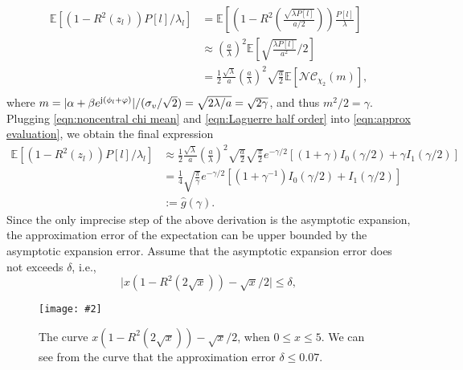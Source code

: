 \documentclass[12pt,draftclsnofoot,journal,onecolumn]{IEEEtran}
\theoremstyle{nonumberplain}
\def \nc {\mathcal{NC}}
\newcommand{\myincludegraphics}[2][width=12cm]{\texttt{[image: \#2]}}
\begin{document}
    \begin{equation}
        \begin{aligned}
        \mathbb{E}[(1-R^2(z_l))P[l]/\lambda_l] & = \mathbb{E}\left[\left(1-R^2\left(\frac{\sqrt{\lambda P[l]}}{a/2}\right)\right)\frac{P[l]}{\lambda}\right] \\
        & \approx \left(\frac{a}{\lambda}\right)^2 \mathbb{E}\left[ \sqrt{\frac{\lambda P[l]}{a^2}}/2 \right]\\
        & = \frac{1}{2}\frac{\sqrt{\lambda}}{a}\left(\frac{a}{\lambda}\right)^2 \sqrt{\frac{a}{2}}\mathbb{E}\left[\nc_{\chi_2}(m)\right],\\
        \end{aligned}
        \label{eqn:approx evaluation}
    \end{equation}
    where $m=\lvert\alpha + \beta e^{{\rm j} (\phi_l + \varphi)}\rvert/(\sigma_v / \sqrt{2}) = \sqrt{2\lambda/a} = \sqrt{2\gamma}$, and thus $m^2/2=\gamma$. Plugging \eqref{eqn:noncentral chi mean} and \eqref{eqn:Laguerre half order} into \eqref{eqn:approx evaluation}, we obtain the final expression 
    \begin{equation}
        \begin{aligned}
        \mathbb{E}[(1-R^2(z_l))P[l]/\lambda_l] & \approx \frac{1}{2}\frac{\sqrt{\lambda}}{a}\left(\frac{a}{\lambda}\right)^2 \sqrt{\frac{a}{2}} \sqrt{\frac{\pi}{2}} e^{-\gamma/2}\left[(1+\gamma)I_0(\gamma/2)+\gamma I_1(\gamma/2)\right] \\
        & = \frac{1}{4}\sqrt{\frac{\pi}{\gamma}}e^{-\gamma/2}\left[(1+\gamma^{-1})I_0(\gamma/2)+ I_1(\gamma/2)\right] \\
        & := \hat{g}(\gamma).
        \end{aligned}
        \label{eqn:approx evaluation result}
    \end{equation}
    Since the only imprecise step of the above derivation is the asymptotic expansion, the approximation error of the expectation can be upper bounded by the asymptotic expansion error. Assume that the asymptotic expansion error does not exceeds $\delta$, i.e.,
    \begin{equation}
        \lvert x(1-R^2(2\sqrt{x}))-\sqrt{x}/2 \rvert \leq \delta,
        \label{eqn:asymptotic error}
    \end{equation}
    \begin{figure}[ht]
        \centering
        \myincludegraphics{figures/asymptotic_expansion.pdf}
        \caption{The curve $x(1-R^2(2\sqrt{x}))-\sqrt{x}/2$, when $0\leq x\leq 5$. We can see from the curve that the approximation error $\delta \leq 0.07$.}
        \label{fig:asymptotic_expansion}
    \end{figure}
\end{document}
